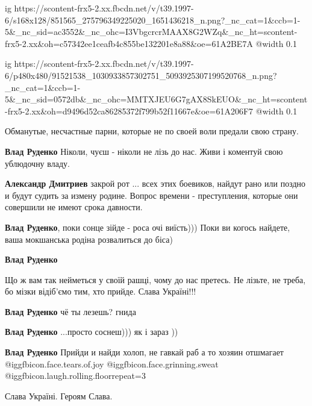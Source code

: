
\ifcmt
  ig https://scontent-frx5-2.xx.fbcdn.net/v/t39.1997-6/s168x128/851565_275796349225020_1651436218_n.png?_nc_cat=1&ccb=1-5&_nc_sid=ac3552&_nc_ohc=I3VbgcrcrMAAX8G2WZq&_nc_ht=scontent-frx5-2.xx&oh=c57342ee1ceafb4c855be132201e8a88&oe=61A2BE7A
  @width 0.1
\fi


\ifcmt
  ig https://scontent-frx5-2.xx.fbcdn.net/v/t39.1997-6/p480x480/91521538_1030933857302751_5093925307199520768_n.png?_nc_cat=1&ccb=1-5&_nc_sid=0572db&_nc_ohc=MMTXJEU6G7gAX8SkEUO&_nc_ht=scontent-frx5-2.xx&oh=d9496d52ca86285372f799b52f11667e&oe=61A206F7
  @width 0.1
\fi


Обманутые, несчастные парни, которые не по своей воли предали свою страну.

\begin{itemize} %
\textbf{Влад Руденко} Ніколи, чуєш - ніколи не лізь до нас. Живи і коментуй свою ублюдочну владу.

\textbf{Александр Дмитриев} закрой рот ... всех этих боевиков, найдут рано или поздно и будут судить за измену родине.
Вопрос времени - преступления, которые они совершили не имеют срока давности.

\textbf{Влад Руденко}, поки сонце зійде - роса очі виїсть))) Поки ви когось найдете, ваша мокшанська родіна розвалиться до біса)

\textbf{Влад Руденко} 

Що ж вам так нейметься у своїй рашці, чому до нас претесь. Не лізьте, не
треба, бо мізки відіб'ємо тим, хто прийде. Слава Україні!!!

\textbf{Влад Руденко} чё ты лезешь? гнида

\textbf{Влад Руденко} ...просто соснеш))) як і зараз ))

\textbf{Влад Руденко} Прийди и найди холоп, не гавкай раб а то хозяин отшмагает @igg{fbicon.face.tears.of.joy}  @igg{fbicon.face.grinning.sweat}  @igg{fbicon.laugh.rolling.floor}{repeat=3} 

\end{itemize} %

Слава Україні. Героям Слава.

